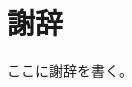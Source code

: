 \documentclass[12pt,a4paper,oneside,onecolumn,fleqn,dvipdfmx]{jreport}
\begin{document}
    \chapter*{謝辞}
        ここに謝辞を書く。
\end{document}
